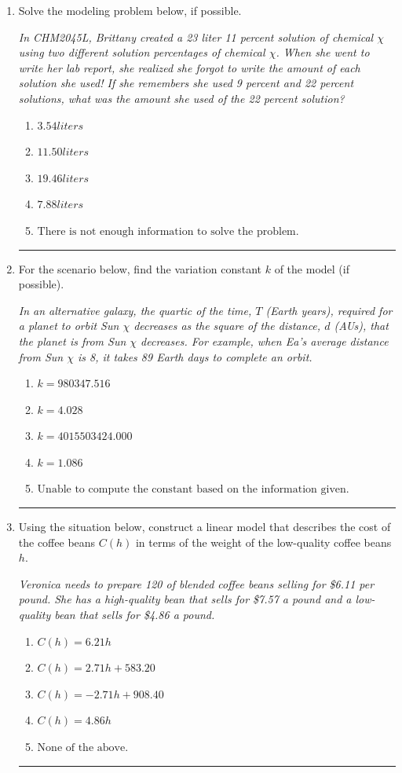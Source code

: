 \documentclass[14pt]{extbook}
\newcommand{\litem}[1]{\item#1\hspace*{-1cm}\rule{\textwidth}{0.4pt}}
\begin{document}
\begin{enumerate}
{\begin{enumerate}[label=\Alph*.]
\end{enumerate} }
\litem{
Solve the modeling problem below, if possible.
\begin{center}
    \textit{ In CHM2045L, Brittany created a 23 liter 11 percent solution of chemical $\chi$ using two different solution percentages of chemical $\chi$. When she went to write her lab report, she realized she forgot to write the amount of each solution she used! If she remembers she used 9 percent and 22 percent solutions, what was the amount she used of the 22 percent solution? }
\end{center}
\begin{enumerate}[label=\Alph*.]
\item \( 3.54 liters \)
\item \( 11.50 liters \)
\item \( 19.46 liters \)
\item \( 7.88 liters \)
\item \( \text{There is not enough information to solve the problem.} \)

\end{enumerate} }
\litem{
For the scenario below, find the variation constant $k$ of the model (if possible).
\begin{center}
    \textit{ In an alternative galaxy, the quartic of the time, $T$ (Earth years), required for a planet to orbit Sun $\chi$ decreases as the square of the distance, $d$ (AUs), that the planet is from Sun $\chi$ decreases. For example, when Ea's average distance from Sun $\chi$ is 8, it takes 89 Earth days to complete an orbit. }
\end{center}
\begin{enumerate}[label=\Alph*.]
\item \( k = 980347.516 \)
\item \( k = 4.028 \)
\item \( k = 4015503424.000 \)
\item \( k = 1.086 \)
\item \( \text{Unable to compute the constant based on the information given.} \)

\end{enumerate} }
\litem{
Using the situation below, construct a linear model that describes the cost of the coffee beans $C(h)$ in terms of the weight of the low-quality coffee beans $h$.
\begin{center}
    \textit{ Veronica needs to prepare 120 of blended coffee beans selling for \$6.11 per pound. She has a high-quality bean that sells for \$7.57 a pound and a low-quality bean that sells for \$4.86 a pound. }
\end{center}
\begin{enumerate}[label=\Alph*.]
\item \( C(h) = 6.21 h \)
\item \( C(h) = 2.71 h + 583.20 \)
\item \( C(h) = -2.71 h + 908.40 \)
\item \( C(h) = 4.86 h \)
\item \( \text{None of the above.} \)


\end{enumerate}}
\end{enumerate}
\end{document}
